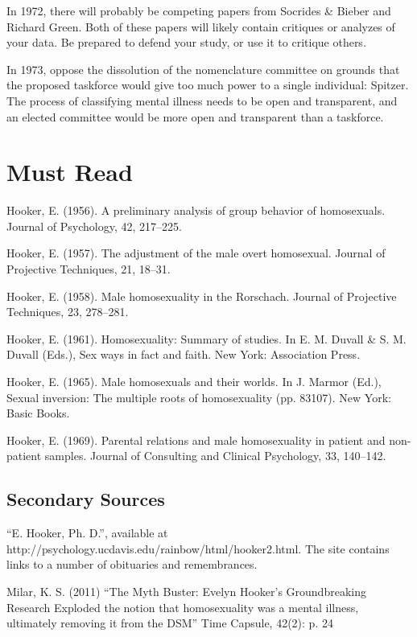 \begin{refsection}
In 1972, there will probably be competing papers from Socrides \& Bieber and Richard Green. Both of these papers will likely contain critiques or analyzes of your data. Be prepared to defend your study, or use it to critique others.

In 1973, oppose the dissolution of the nomenclature committee on grounds that the proposed taskforce would give too much power to a single individual: Spitzer. The process of classifying mental illness needs to be open and transparent, and an elected committee would be more open and transparent than a taskforce.

\section{Must Read}
\label{mustread}

Hooker, E. (1956). A preliminary analysis of group behavior of homosexuals. Journal of Psychology, 42, 217--225.

Hooker, E. (1957). The adjustment of the male overt homosexual. Journal of Projective Techniques, 21, 18--31.

Hooker, E. (1958). Male homosexuality in the Rorschach. Journal of Projective Techniques, 23, 278--281.

Hooker, E. (1961). Homosexuality: Summary of studies. In E. M. Duvall \& S. M. Duvall (Eds.), Sex ways in fact and faith. New York: Association Press.

Hooker, E. (1965). Male homosexuals and their worlds. In J. Marmor (Ed.), Sexual inversion: The multiple roots of homosexuality (pp. 83107). New York: Basic Books.

Hooker, E. (1969). Parental relations and male homosexuality in patient and non-patient samples. Journal of Consulting and Clinical Psychology, 33, 140--142.

\subsection{Secondary Sources}
\label{secondarysources}

``E. Hooker, Ph. D.'', available at http:\slash \slash psychology.ucdavis.edu\slash rainbow\slash html\slash hooker2.html. The site contains links to a number of obituaries and remembrances.

Milar, K. S. (2011) ``The Myth Buster: Evelyn Hooker's Groundbreaking Research Exploded the notion that homosexuality was a mental illness, ultimately removing it from the DSM'' Time Capsule, 42(2): p. 24


\end{refsection}

